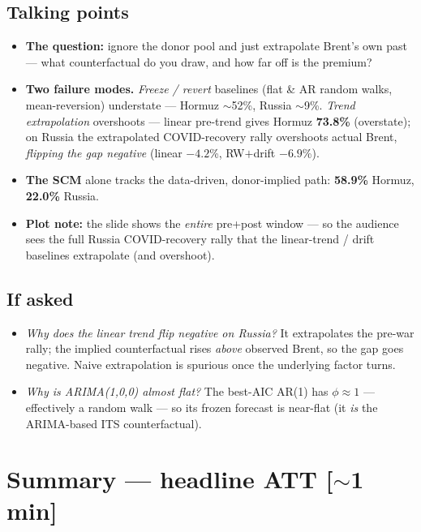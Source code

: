\documentclass[11pt,a4paper]{article}
\newcommand{\timetag}[1]{\hfill\textcolor{muted}{\small[#1]}}
\newcommand{\highlight}[1]{\textcolor{accent}{\textbf{#1}}}
\begin{document}
\subsection{Talking points}
\begin{itemize}
  \item \highlight{The question:} ignore the donor pool and just extrapolate Brent's own past --- what
    counterfactual do you draw, and how far off is the premium?
  \item \highlight{Two failure modes.} \emph{Freeze / revert} baselines (flat \& AR random walks,
    mean-reversion) understate --- Hormuz $\sim$52\%, Russia $\sim$9\%. \emph{Trend extrapolation}
    overshoots --- linear pre-trend gives Hormuz \textbf{73.8\%} (overstate); on Russia the extrapolated
    COVID-recovery rally overshoots actual Brent, \emph{flipping the gap negative} (linear $-4.2$\%,
    RW$+$drift $-6.9$\%).
  \item \highlight{The SCM} alone tracks the data-driven, donor-implied path: \textbf{58.9\%} Hormuz,
    \textbf{22.0\%} Russia.
  \item \highlight{Plot note:} the slide shows the \emph{entire} pre+post window --- so the audience sees
    the full Russia COVID-recovery rally that the linear-trend / drift baselines extrapolate (and overshoot).
\end{itemize}

\subsection{If asked}
\begin{itemize}
  \item \textit{Why does the linear trend flip negative on Russia?} It extrapolates the pre-war rally; the
    implied counterfactual rises \emph{above} observed Brent, so the gap goes negative. Naive
    extrapolation is spurious once the underlying factor turns.
  \item \textit{Why is ARIMA(1,0,0) almost flat?} The best-AIC AR(1) has $\phi \approx 1$ --- effectively
    a random walk --- so its frozen forecast is near-flat (it \emph{is} the ARIMA-based ITS counterfactual).
\end{itemize}

\section{Summary --- headline ATT \timetag{$\sim$1 min}}
\end{document}
